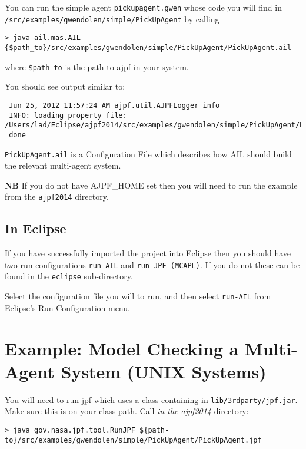You can run the simple agent \texttt{pickupagent.gwen} whose code you will find in \texttt{/src/examples/gwendolen/simple/PickUpAgent} by calling

\noindent \begin{lstlisting}[basicstyle=\tiny]
> java ail.mas.AIL {$path_to}/src/examples/gwendolen/simple/PickUpAgent/PickUpAgent.ail
\end{lstlisting}
\medskip

\noindent where \texttt{\${path-to}} is the path to ajpf in your system.

You should see output similar to:

\noindent \begin{lstlisting}
 Jun 25, 2012 11:57:24 AM ajpf.util.AJPFLogger info
 INFO: loading property file: /Users/lad/Eclipse/ajpf2014/src/examples/gwendolen/simple/PickUpAgent/PickUpAgent.ail
 done
\end{lstlisting}
\medskip
 
\texttt{PickUpAgent.ail} is a Configuration File which describes how AIL should build the relevant multi-agent system.

{\bf NB}  If you do not have AJPF\_HOME set then you will need to run the example from the \texttt{ajpf2014} directory.

\subsection{In Eclipse}

If you have successfully imported the project into Eclipse then you should have two run configurations \texttt{run-AIL} and \texttt{run-JPF (MCAPL)}.  If you do not these can be found in the \texttt{eclipse} sub-directory.

Select the configuration file you will to run, and then select \texttt{run-AIL} from Eclipse's Run Configuration menu.


\section{Example: Model Checking a Multi-Agent System (UNIX Systems)}

You will need to run jpf which uses a class containing in \texttt{lib/3rdparty/jpf.jar}.  Make sure this is on your class path.  Call \emph{in the ajpf2014} directory:

\noindent \begin{lstlisting}[basicstyle=\tiny]
> java gov.nasa.jpf.tool.RunJPF ${path-to}/src/examples/gwendolen/simple/PickUpAgent/PickUpAgent.jpf
\end{lstlisting}
\medskip

